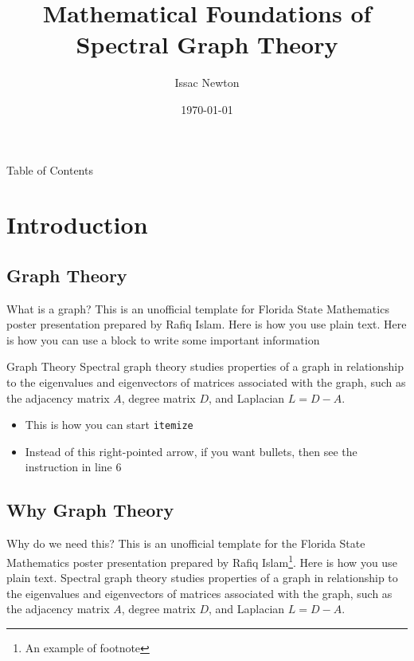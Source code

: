 \documentclass{beamer}
\title[A short version of the title goes here]{Mathematical Foundations of Spectral Graph Theory }
\author[Newton]{Issac Newton}
\institute{Florida State University}
\date{\today}
\begin{document}
\maketitle

\begin{frame}{Table of Contents}
\tableofcontents[subsectionstyle=hide, sectionstyle=show]
\end{frame}
\section{Introduction}
\subsection{Graph Theory}
\begin{frame}{What is a graph?}
    This is an unofficial template for Florida State Mathematics poster presentation prepared by Rafiq 
    Islam\cite{fsumathposter25}. Here is how you use plain text. Here is how you can use a block to write some important information \cite{fsubeamerpresent25}
    \begin{block}{Graph Theory}
        Spectral graph theory studies properties of a graph in relationship to the eigenvalues and eigenvectors of matrices associated with the graph, such as the adjacency matrix $A$, degree matrix $D$, and Laplacian $L = D - A$.
    \end{block}
   \begin{itemize}
    \item This is how you can start \texttt{itemize}
    \item Instead of this right-pointed arrow, if you want bullets, then see the instruction in line 6
\end{itemize}
\end{frame}
\subsection{Why Graph Theory}
\begin{frame}{Why do we need this?}
This is an unofficial template for the Florida State Mathematics poster presentation prepared by Rafiq Islam\footnote{An example of footnote}. Here is how you use plain text. Spectral graph theory studies properties of a graph in relationship to the eigenvalues and eigenvectors of matrices associated with the graph, such as the adjacency matrix $A$, degree matrix $D$, and Laplacian $L = D - A$.
\end{frame}
\end{document}
